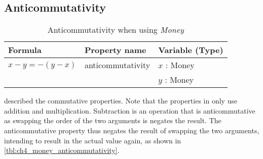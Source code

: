 \subsection*{Anticommutativity}
\label{ssct:properties_anticommutativity}
\begin{table}[!ht]
\centering
\begin{tabular}{lll}
\hline
                        \textbf{Formula}        & \textbf{Property name} & \textbf{Variable (Type)}    \\ \hline
\rowcolor[HTML]{EFEFEF} $x - y = -(y - x)$ & anticommutativity      & $x$ : Money                 \\
\rowcolor[HTML]{EFEFEF}                         &                        & $y$ : Money                 \\ \hline
\end{tabular}
\caption{Anticommutativity when using \textit{Money}}
\label{tbl:ch4_money_anticommutativity}
\end{table}
\FloatBarrier\noindent
 described the commutative properties.
Note that the properties in  only use
addition and multiplication. Subtraction is an operation that is anticommutative
as swapping the order of the two arguments is negates the result. The
anticommutative property thus negates the result of swapping the two arguments,
intending to result in the actual value again, as shown in
\autoref{tbl:ch4_money_anticommutativity}.
